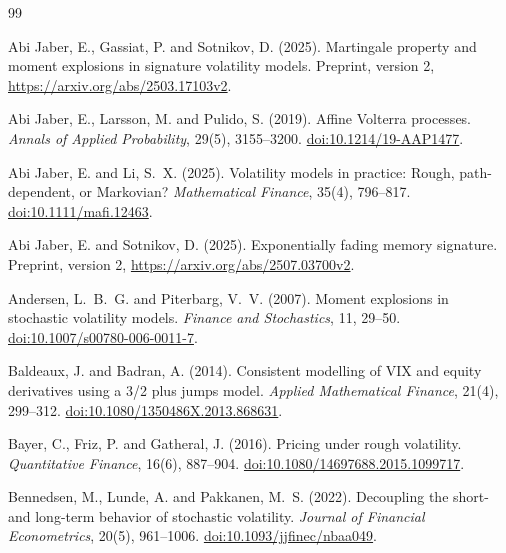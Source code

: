 \documentclass[11pt,a4paper]{article}
\theoremstyle{definition}
\theoremstyle{remark}
\begin{document}
\begin{thebibliography}{99}

Abi Jaber, E., Gassiat, P. and Sotnikov, D. (2025).
Martingale property and moment explosions in signature volatility models.
Preprint, version 2, \url{https://arxiv.org/abs/2503.17103v2}.

Abi Jaber, E., Larsson, M. and Pulido, S. (2019).
Affine Volterra processes.
\emph{Annals of Applied Probability}, 29(5), 3155--3200.
\href{https://doi.org/10.1214/19-AAP1477}{doi:10.1214/19-AAP1477}.

Abi Jaber, E. and Li, S.~X. (2025).
Volatility models in practice: Rough, path-dependent, or Markovian?
\emph{Mathematical Finance}, 35(4), 796--817.
\href{https://doi.org/10.1111/mafi.12463}{doi:10.1111/mafi.12463}.

Abi Jaber, E. and Sotnikov, D. (2025).
Exponentially fading memory signature.
Preprint, version 2, \url{https://arxiv.org/abs/2507.03700v2}.

Andersen, L.~B.~G. and Piterbarg, V.~V. (2007).
Moment explosions in stochastic volatility models.
\emph{Finance and Stochastics}, 11, 29--50.
\href{https://doi.org/10.1007/s00780-006-0011-7}{doi:10.1007/s00780-006-0011-7}.

Baldeaux, J. and Badran, A. (2014).
Consistent modelling of VIX and equity derivatives using a 3/2 plus jumps model.
\emph{Applied Mathematical Finance}, 21(4), 299--312.
\href{https://doi.org/10.1080/1350486X.2013.868631}{doi:10.1080/1350486X.2013.868631}.

Bayer, C., Friz, P. and Gatheral, J. (2016).
Pricing under rough volatility.
\emph{Quantitative Finance}, 16(6), 887--904.
\href{https://doi.org/10.1080/14697688.2015.1099717}{doi:10.1080/14697688.2015.1099717}.

Bennedsen, M., Lunde, A. and Pakkanen, M.~S. (2022).
Decoupling the short- and long-term behavior of stochastic volatility.
\emph{Journal of Financial Econometrics}, 20(5), 961--1006.
\href{https://doi.org/10.1093/jjfinec/nbaa049}{doi:10.1093/jjfinec/nbaa049}.


\end{thebibliography}
\end{document}
